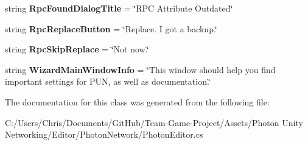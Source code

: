 \begin{DoxyCompactItemize}
\item 
string {\bfseries Rpc\+Found\+Dialog\+Title} = \char`\"{}R\+PC Attribute Outdated\char`\"{}\hypertarget{class_pun_wizard_text_aafdf8966fc6e4461a8a03c6bc0489aca}{}\label{class_pun_wizard_text_aafdf8966fc6e4461a8a03c6bc0489aca}

\item 
string {\bfseries Rpc\+Replace\+Button} = \char`\"{}Replace. I got a backup.\char`\"{}\hypertarget{class_pun_wizard_text_a7f737e36d4f8b456141eb1871df1dd52}{}\label{class_pun_wizard_text_a7f737e36d4f8b456141eb1871df1dd52}

\item 
string {\bfseries Rpc\+Skip\+Replace} = \char`\"{}Not now.\char`\"{}\hypertarget{class_pun_wizard_text_a34ac77aec040899c39d68191c5a3084c}{}\label{class_pun_wizard_text_a34ac77aec040899c39d68191c5a3084c}

\item 
string {\bfseries Wizard\+Main\+Window\+Info} = \char`\"{}This window should help you find important settings for P\+UN, as well as documentation.\char`\"{}\hypertarget{class_pun_wizard_text_ac25c43cc0f3bc50da2fc3ce8dec0ca56}{}\label{class_pun_wizard_text_ac25c43cc0f3bc50da2fc3ce8dec0ca56}

\end{DoxyCompactItemize}


The documentation for this class was generated from the following file\+:\begin{DoxyCompactItemize}
\item 
C\+:/\+Users/\+Chris/\+Documents/\+Git\+Hub/\+Team-\/\+Game-\/\+Project/\+Assets/\+Photon Unity Networking/\+Editor/\+Photon\+Network/Photon\+Editor.\+cs\end{DoxyCompactItemize}
